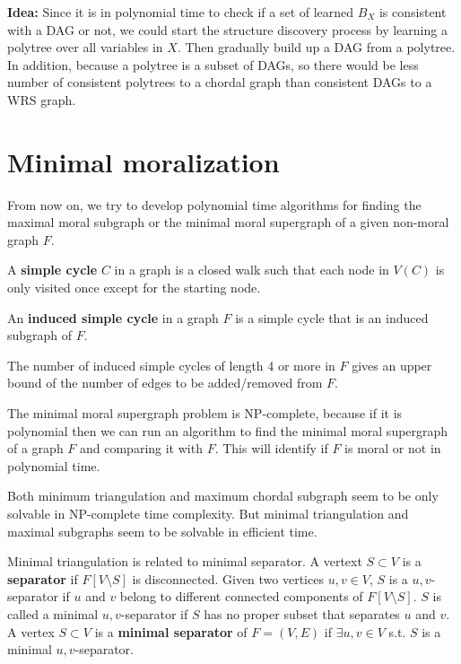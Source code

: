\textbf{Idea:} Since it is in polynomial time to check if a set of learned $B_X$ is consistent with a DAG or not, we could start the structure discovery process by learning a polytree over all variables in $X$. Then gradually build up a DAG from a polytree. In addition, because a polytree is a subset of DAGs, so there would be less number of consistent polytrees to a chordal graph than consistent DAGs to a WRS graph. 


\newpage
\section{Minimal moralization}
From now on, we try to develop polynomial time algorithms for finding the maximal moral subgraph or the minimal moral supergraph of a given non-moral graph $F$.

\begin{definition}
A \textbf{simple cycle} $C$ in a graph is a closed walk such that each node in $V(C)$ is only visited once except for the starting node.
\end{definition}

\begin{definition}
An \textbf{induced simple cycle} in a graph $F$ is a simple cycle that is an induced subgraph of $F$. 
\end{definition}

\begin{remark}
The number of induced simple cycles of length 4 or more in $F$ gives an upper bound of the number of edges to be added/removed from $F$.
\end{remark}

\begin{remark}
The minimal moral supergraph problem is NP-complete, because if it is polynomial then we can run an algorithm to find the minimal moral supergraph of a graph $F$ and comparing it with $F$. This will identify if $F$ is moral or not in polynomial time. 
\end{remark}

Both minimum triangulation and maximum chordal subgraph seem to be only solvable in NP-complete time complexity. But minimal triangulation and maximal subgraphs seem to be solvable in efficient time. 

Minimal triangulation is related to minimal separator. A vertext $S\subset V$ is a \textbf{separator} if $F[V\setminus S]$ is disconnected. Given two vertices $u,v\in V$, $S$ is a $u,v$-separator if $u$ and $v$ belong to different connected components of $F[V\setminus S]$. $S$ is called a minimal $u,v$-separator if $S$ has no proper subset that separates $u$ and $v$. A vertex $S\subset V$ is a \textbf{minimal separator} of $F=(V,E)$ if $\exists u, v \in V$ s.t. $S$ is a minimal $u,v$-separator. 
 

